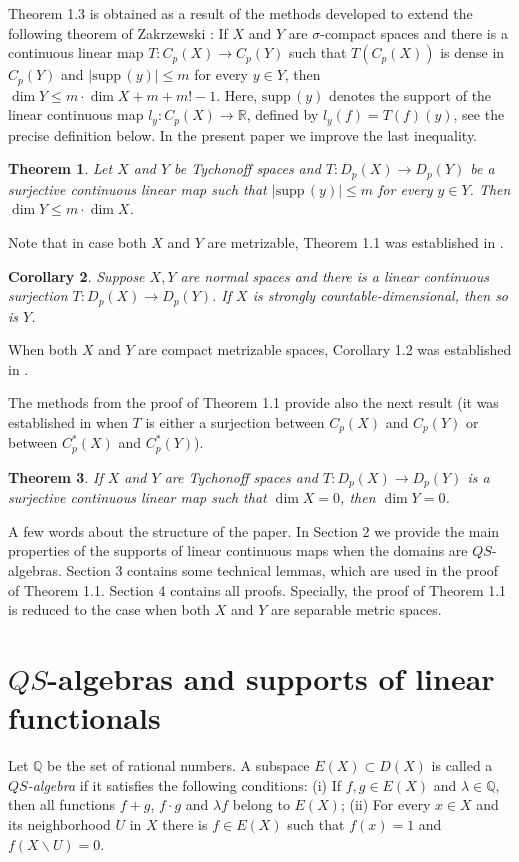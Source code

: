 \documentclass[12pt]{amsart}
\newtheorem{thm}{Theorem}[section]
\newtheorem{cor}[thm]{Corollary}
\def\supp{{\mathrm {supp}}\,}
\begin{document}
Theorem 1.3 is obtained as a result of the methods developed to extend the following theorem of
Zakrzewski \cite[Theorem 3.12]{kz}: If $X$ and $Y$ are $\sigma$-compact spaces 
and there is a continuous linear map $T:C_p(X)\to C_p(Y)$ such that $T(C_p(X))$ is dense in $C_p(Y)$ and $|\supp(y)|\leq m$ for every $y\in Y$, then
$\dim Y\leq m\cdot\dim X+m+m!-1$. Here, $\supp(y)$ denotes the support of the linear continuous map $l_y:C_p(X)\to\mathbb R$, defined by 
$l_y(f)=T(f)(y)$, see the precise definition below. In the present paper we improve the last inequality.

\begin{thm}\label{theorem-main} Let $X$ and $Y$ be Tychonoff spaces and $T:D_p(X)\to D_p(Y)$ be a surjective continuous linear map such that $|\supp(y)|\leq m$ for every $y\in Y$. Then $\dim Y\leq m\cdot\dim X$.
 \end{thm} 
Note that in case both $X$ and $Y$ are metrizable, Theorem 1.1 was established in \cite{lv}.
\begin{cor}
Suppose $X,Y$ are normal spaces and there is a linear continuous surjection $T:D_p(X)\to D_p(Y)$. If $X$  is strongly countable-dimensional, then so is $Y$.
\end{cor} 
When both $X$ and $Y$ are compact metrizable spaces, Corollary 1.2 was established in \cite[Theorem 4.2(b)]{gkm}.

The methods from the proof of Theorem 1.1 provide also the next result (it was established in \cite{ev} when $T$ is either a surjection between $C_p(X)$ and $C_p(Y)$ or between $C_p^*(X)$ and $C_p^*(Y)$).
\begin{thm}
If $X$ and $Y$ are Tychonoff spaces and  $T:D_p(X)\to D_p(Y)$ is a surjective continuous linear map such that $\dim X=0$, then $\dim Y=0$.
\end{thm} 
A few words about the structure of the paper. In Section 2 we provide the main properties of the supports of linear continuous maps when the domains are $QS$-algebras. Section 3 contains some technical lemmas, which are used in the proof of Theorem 1.1. Section 4 contains all proofs. Specially, the proof of Theorem 1.1 is reduced to the case when both $X$ and $Y$ are separable metric spaces.  

\section{$QS$-algebras and supports of linear functionals}
Let $\mathbb Q$ be the set of rational numbers. A subspace $E(X)\subset D(X)$ is called a {\em $QS$-algebra} \cite{gu} if it satisfies the following conditions: (i) If $f,g\in E(X)$ and $\lambda\in\mathbb Q$, then all functions $f+g$, $f\cdot g$ and $\lambda f$ belong to $E(X)$; (ii) For every $x\in X$ and its neighborhood $U$ in $X$ there is $f\in E(X)$ such that $f(x)=1$ and $f(X\backslash U)=0$. 
\end{document}
